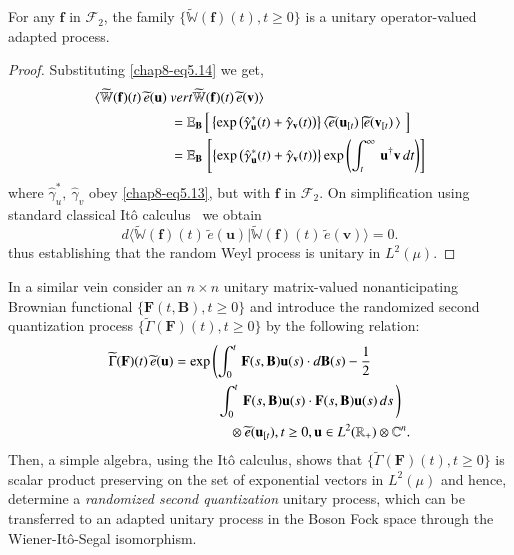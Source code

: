 \begin{thm}\label{chap8-thm1}
For any $\mathbf{f}$ in $\mathcal{F}_2$, the family  
$\{\widetilde{\mathbb{W}}(\mathbf{f})(t), t\geq 0\}$ is  a unitary operator-valued adapted process.
\end{thm}
\begin{proof}
Substituting \eqref{chap8-eq5.14} we get,  
\begin{align}
\langle \widetilde{\mathbb{W}}(\mathbf{f})(t)\, \widetilde{e}(\mathbf{u})\ & vert \widetilde{\mathbb{W}}
(\mathbf{f})(t)\, \widetilde{e}(\mathbf{v})\rangle\notag\\ 
& = \mathbb{E}_{\mathbf{B}}\, \Big[ \left\{{\exp}\left({\hat{\gamma}_\mathbf{u}^*(t)}+{\hat{\gamma}_\mathbf{v}(t)}\right) \right\}
\langle \widetilde{e}(\mathbf{u}_{[t})\,\vert  \widetilde{e}(\mathbf{v}_{[t})\,\rangle\, \, \Big] \nonumber \\
&=\mathbb{E}_{\mathbf{B}}\, \left[   \left\{{\rm exp}\left({\hat{\gamma}_\mathbf{u}^*(t)}
+{\hat{\gamma}_\mathbf{v}(t)}\right) \right\} {\rm exp}\left(\int_t^\infty\, \mathbf{u}^\dag\mathbf{v}\, dt\right)\right]
\end{align}
where $\hat{\gamma}_u^*,\ \hat{\gamma}_v$ obey \eqref{chap8-eq5.13}, but with  $\mathbf{f}$ in $\mathcal{F}_2$.  On simplification using standard classical It{\^o} calculus~\cite{chap8-key38} we obtain  
\begin{equation}
d\langle \widetilde{\mathbb{W}}(\mathbf{f})(t)\, \widetilde{e}(\mathbf{u})\vert \widetilde{\mathbb{W}}
(\mathbf{f})(t)\, \widetilde{e}(\mathbf{v})\rangle= 0.\label{chap8-eq5.16}
\end{equation}
thus establishing that the random Weyl process is unitary in $L^2(\mu)$.
\end{proof}

In a similar vein  consider an $n\times n$ unitary matrix-valued nonanticipating Brownian functional $\{\mathbf{F}(t,\mathbf{B}), t\geq 0\}$ and introduce the randomized second quantization process $\{\widetilde{\Gamma}(\mathbf{F})(t), t\geq 0\}$ by the following relation: 
\begin{align}
\widetilde{\Gamma}(\mathbf{F})(t)\,  \widetilde{e}(\mathbf{u}) &= {\exp}\left(\int_0^t\, \mathbf{F}(s,\mathbf{B})\mathbf{u}(s)\cdot d\mathbf{B}(s) - \frac{1}{2}\,\right. \notag \\ 
& \qquad \quad \left. \int_0^t\, \mathbf{F}(s,\mathbf{B})\mathbf{u}(s) \cdot \mathbf{F}(s,\mathbf{B})\mathbf{u}(s)\, ds\,\right)\notag \\ 
& \qquad \qquad\otimes \widetilde{e}(\mathbf{u}_{[t}), t\geq 0, \mathbf{u}\in L^2(\mathbb{R}_+)\otimes \mathbb{C}^n.  \label{chap8-eq5.17}
\end{align}
Then, a simple algebra, using the It{\^o} calculus, shows that $\{\widetilde{\Gamma}(\mathbf{F})(t), t\geq 0\}$ is scalar product preserving on the set of exponential vectors in $L^2(\mu)$ and hence, determine a {\em randomized second quantization} unitary process, which can be transferred to an adapted unitary process in the Boson Fock space through the Wiener-It{\^o}-Segal isomorphism. 

